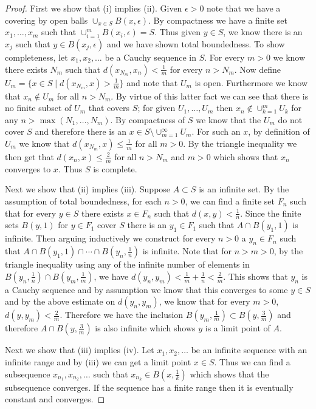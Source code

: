 \documentclass{amsart}
\theoremstyle{remark}
\theoremstyle{definition}
\begin{document}
\begin{proof}
First we show that (i) implies (ii).  Given $\epsilon > 0$ note that
we have a covering by open balls $\cup_{x \in S} B(x, \epsilon)$.  By
compactness we have a finite set $x_1, \dots, x_m$ such that
$\cup_{i=1}^m B(x_i, \epsilon) = S$.  Thus given $y \in S$, we know
there is an $x_j$ such that $y \in B(x_j, \epsilon)$ and we have shown
total boundedness.  To show completeness, let $x_1, x_2, \dots$ be a
Cauchy sequence in $S$.  For every $m > 0$ we know there exists $N_m$
such that $d(x_{N_m}, x_n) < \frac{1}{m}$ for every $n > N_m$.  Now
define $U_m = \lbrace x \in S \mid d(x_{N_m}, x) > \frac{1}{m}\rbrace$
and note that $U_m$ is open. Furthermore we know that $x_n \notin U_m$
for all $n > N_m$.  By virtue of this latter fact we can see that
there is no finite subset of $U_m$ that covers $S$; for given $U_1,
\dots, U_m$ then $x_n \notin \cup_{k=1}^m U_k$ for any $n > \max(N_1,
\dots, N_m)$.  By compactness of $S$ we know that the $U_m$ do not
cover $S$ and therefore there is an $x \in S \setminus
\cup_{m=1}^\infty U_m$.  For such an $x$, by definition of $U_m$ we
know that $d(x_{N_m}, x) \leq \frac{1}{m}$ for all $m > 0$.  By the
triangle inequality we then get that $d(x_n, x) \leq \frac{2}{m}$ for
all $n > N_m$ and $m > 0$ which shows that $x_n$ converges to $x$.
Thus $S$ is complete.

Next we show that (ii) implies (iii).  Suppose $A \subset S$ is an
infinite set.  By the assumption of total boundedness, for each $n >
0$, we can find a finite set $F_n$ such that for every $y \in S$ there
exists $x \in F_n$ such that $d(x,y) < \frac{1}{n}$.  Since the finite
sets $B(y, 1)$ for $y \in F_1$ cover $S$ there is an $y_1 \in F_1$
such that $A \cap B(y_1, 1)$ is infinite.  Then arguing inductively we
construct for every $n>0$ a $y_n \in F_n$ such that $A \cap B(y_1,1)
\cap \cdots \cap B(y_n, \frac{1}{n})$ is infinite.  Note that for $n > m
>0$, by the triangle inequality using any of the infinite number of
elements in $B(y_n, \frac{1}{n}) \cap B(y_m, \frac{1}{m})$, we have $d(y_n, y_m) < \frac{1}{m} +
\frac{1}{n} < \frac{2}{m}$.  This shows that $y_n$ is a Cauchy
sequence and by assumption we know that this converges to some $y \in
S$ and by the above estimate on $d(y_n, y_m)$, we know that for every
$m > 0$, $d(y, y_m) < \frac{2}{m}$.  Therefore we have the inclusion
$B(y_m, \frac{1}{m}) \subset B(y, \frac{3}{m})$ and therefore $A \cap
B(y, \frac{3}{m})$ is also infinite which shows $y$ is a limit point
of $A$.

Next we show that (iii) implies (iv).  Let $x_1, x_2, \dots$ be an
infinite sequence with an infinite range and by (iii) we can get a limit point $x \in S$.
Thus we can find a subsequence $x_{n_1}, x_{n_2}, \dots$ such that
$x_{n_k} \in B(x, \frac{1}{k})$ which shows that the subsequence
converges.  If the sequence has a finite range then it is eventually
constant and converges.


\end{proof}
\end{document}
